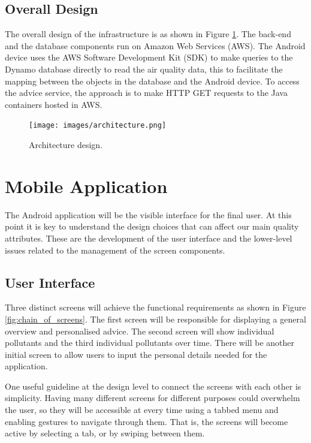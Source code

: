 \subsection{Overall Design}
The overall design of the infrastructure is as shown in Figure \ref{fig:architecture}. The back-end and the database components run on Amazon Web Services (AWS). The Android device uses the AWS Software Development Kit (SDK) to make queries to the Dynamo database directly to read the air quality data, this to facilitate the mapping between the objects in the database and the Android device. To access the advice service, the approach is to make HTTP GET requests to the Java containers hosted in AWS. 
\begin{figure}[H]
\begin{adjustbox}{width=.65\textwidth,center=\textwidth}
  \centering
  \texttt{[image: images/architecture.png]}
\end{adjustbox}
  \caption[Architecture design]{Architecture design.}
  \label{fig:architecture}
\end{figure}

\section{Mobile Application}
The Android application will be the visible interface for the final user. At this point it is key to understand the design choices that can affect our main quality attributes. These are the development of the user interface and the lower-level issues related to the management of the screen components.

\subsection{User Interface}
Three distinct screens will achieve the functional requirements as shown in Figure \ref{fig:chain_of_screens}. The first screen will be responsible for displaying a general overview and personalised advice. The second screen will show individual pollutants and the third individual pollutants over time. There will be another initial screen to allow users to input the personal details needed for the application.

One useful guideline at the design level to connect the screens with each other is simplicity. Having many different screens for different purposes could overwhelm the user, so they will be accessible at every time using a tabbed menu and enabling gestures to navigate through them. That is, the screens will become active by selecting a tab, or by swiping between them.

